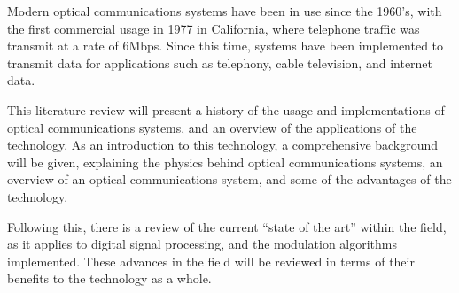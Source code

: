 Modern optical communications systems have been in use since the 1960's, with
the first commercial usage in 1977 in California, where telephone traffic was
transmit at a rate of 6Mbps\cite{alwayn_2004}. Since this time, systems have
been implemented to transmit data for applications such as telephony, cable
television, and internet data.

\par This literature review will present a history of the usage and
implementations of optical communications systems, and an overview of the
applications of the technology. As an introduction to this technology, a
comprehensive background will be given, explaining the physics behind optical
communications systems, an overview of an optical communications system, and
some of the advantages of the technology.

\par Following this, there is a review of the current ``state of the art'' within the
field, as it applies to digital signal processing, and the modulation algorithms
implemented. These advances in the field will be reviewed in terms of their
benefits to the technology as a whole.
